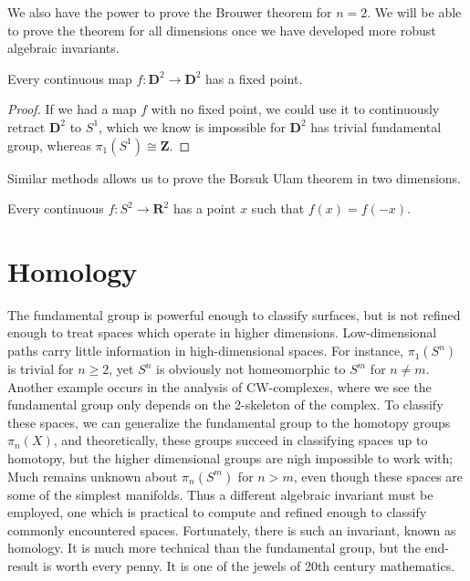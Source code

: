 We also have the power to prove the Brouwer theorem for $n = 2$. We will be able to prove the theorem for all dimensions once we have developed more robust algebraic invariants.

\begin{theorem}
    Every continuous map $f: \mathbf{D}^2 \to \mathbf{D}^2$ has a fixed point.
\end{theorem}
\begin{proof}
    If we had a map $f$ with no fixed point, we could use it to continuously retract $\mathbf{D}^2$ to $S^1$, which we know is impossible for $\mathbf{D}^2$ has trivial fundamental group, whereas $\pi_1(S^1) \cong \mathbf{Z}$.
\end{proof}

Similar methods allows us to prove the Borsuk Ulam theorem in two dimensions.

\begin{theorem}
    Every continuous $f: S^2 \to \mathbf{R}^2$ has a point $x$ such that $f(x) = f(-x)$.
\end{theorem}






\chapter{Homology}

The fundamental group is powerful enough to classify surfaces, but is not refined enough to treat spaces which operate in higher dimensions. Low-dimensional paths carry little information in high-dimensional spaces. For instance, $\pi_1(S^n)$ is trivial for $n \geq 2$, yet $S^n$ is obviously not homeomorphic to $S^m$ for $n \neq m$. Another example occurs in the analysis of CW-complexes, where we see the fundamental group only depends on the 2-skeleton of the complex. To classify these spaces, we can generalize the fundamental group to the homotopy groups $\pi_n(X)$, and theoretically, these groups succeed in classifying spaces up to homotopy, but the higher dimensional groups are nigh impossible to work with; Much remains unknown about $\pi_n(S^m)$ for $n > m$, even though these spaces are some of the simplest manifolds. Thus a different algebraic invariant must be employed, one which is practical to compute and refined enough to classify commonly encountered spaces. Fortunately, there is such an invariant, known as homology. It is much more technical than the fundamental group, but the end-result is worth every penny. It is one of the jewels of 20th century mathematics.

